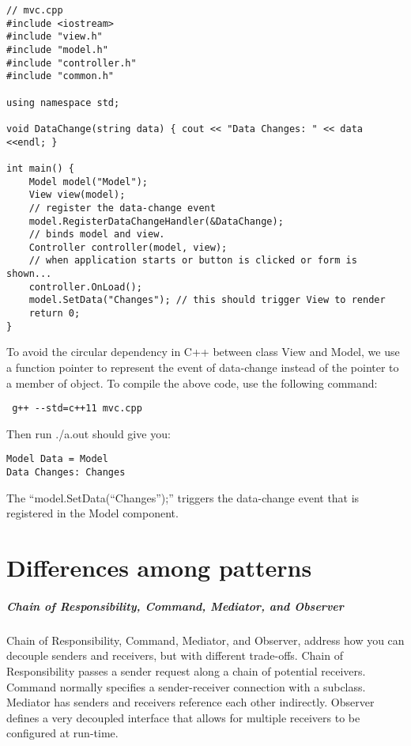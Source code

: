 \documentclass{book}
\begin{document}
\begin{lstlisting}
// mvc.cpp
#include <iostream>
#include "view.h"
#include "model.h"
#include "controller.h"
#include "common.h"
 
using namespace std;

void DataChange(string data) { cout << "Data Changes: " << data <<endl; }
 
int main() {
    Model model("Model");
    View view(model);    
    // register the data-change event
    model.RegisterDataChangeHandler(&DataChange);
    // binds model and view.
    Controller controller(model, view);
    // when application starts or button is clicked or form is shown...
    controller.OnLoad();
    model.SetData("Changes"); // this should trigger View to render
    return 0;
}
\end{lstlisting}
To avoid the circular dependency in C++ between class View and Model, we use a function pointer to represent the event of data-change instead of the pointer to a member of object. 
To compile the above code, use the following command:
\begin{Verbatim}
 g++ --std=c++11 mvc.cpp
\end{Verbatim}
Then run ./a.out should give you:

\begin{Verbatim}
Model Data = Model
Data Changes: Changes
\end{Verbatim}
The ``model.SetData(“Changes”);'' triggers the data-change event that is registered in the Model component.

\chapter{Differences among patterns}\label{difampa}

\paragraph{Chain of Responsibility, Command, Mediator, and Observer}

    Chain of Responsibility, Command, Mediator, and Observer, address how you can decouple senders and receivers, but with different trade-offs.
    Chain of Responsibility passes a sender request along a chain of potential receivers.
    Command normally specifies a sender-receiver connection with a subclass.
    Mediator has senders and receivers reference each other indirectly.
    Observer defines a very decoupled interface that allows for multiple receivers to be configured at run-time.
\end{document}
